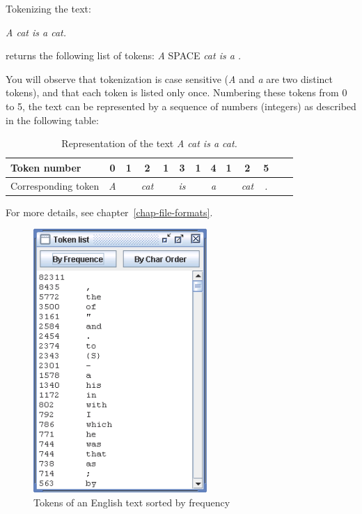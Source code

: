 \bigskip
\noindent Tokenizing the text:

\bigskip
\textit{A cat is a cat.}

\bigskip
\noindent returns the following list of tokens: \textit{A} SPACE \textit{cat is a .}

\bigskip
\noindent You will observe that tokenization is case sensitive (\textit{A} and
\textit{a} are two distinct tokens), and that each token is listed only once.
Numbering these tokens from 0 to 5, the text can be represented by a sequence of
numbers (integers) as described in the following table:

\bigskip
\begin{table}[!ht]
\begin{center}
\begin{tabular}{|p{2.8cm}||c|c|c|c|c|c|c|c|c|c|c|c|}
\hline
Token number               & 0 & 1 & 2 & 1 & 3 & 1 & 4 & 1 & 2 & 5
\\
\hline
Corresponding token & \textit{A} &   & \textit{cat} &   & \textit{is} &  & \textit{a}
& & \textit{cat} & \textit{.}
\\
\hline
\end{tabular}
\caption{Representation of the text \textit{A cat is a cat.}}
\end{center}
\end{table}

\bigskip
\noindent For more details, see chapter~\ref{chap-file-formats}.

\begin{figure}[!ht]
\begin{center}
\includegraphics[height=10cm]{resources/img/fig2-12.png}
\caption{Tokens of an English text sorted by frequency}
\end{center}
\end{figure}



